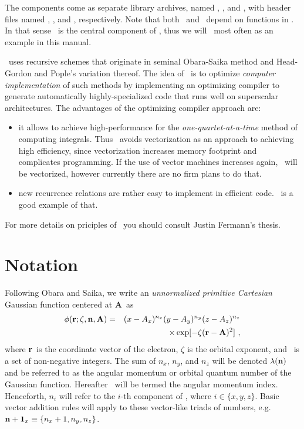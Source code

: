 \documentclass[12pt]{article}
\begin{document}
The components come as separate library archives, named \libinta , \libderiva , and \librija ,
with header files named \libinth , \libderivh , and \librijh , respectively.
Note that both \libderiv\ and \librij\ depend on functions in \libint. In that sense \libint\ is
the central component of \LIBINT, thus we will \libint\ most often as an example in this manual.

\LIBINT\ uses recursive schemes that originate in seminal Obara-Saika method\cite{Obara86} and Head-Gordon and Pople's
variation thereof.\cite{Head-Gordon88}
The idea of \LIBINT\ is to optimize {\em computer implementation} of such methods by implementing
an optimizing compiler to generate automatically highly-specialized code that runs well on
superscalar architectures. The advantages of the optimizing compiler approach are:
\begin{itemize}
\item it allows to achieve high-performance
for the {\em one-quartet-at-a-time} method of computing integrals.
Thus \LIBINT\ avoids vectorization as an approach to achieving high efficiency,
since vectorization increases memory footprint and complicates programming. If the use of vector
machines increases again, \LIBINT\ will be vectorized, however currently there are no firm plans
to do that.
\item new recurrence relations are rather easy to implement in efficient code.
\librij\ is a good example of that.
\end{itemize}

For more details on priciples of \LIBINT\ you should consult Justin Fermann's thesis.\cite{Fermann96:PhD}

\section{Notation}

Following Obara and Saika,\cite{Obara86}
we write an {\em unnormalized primitive Cartesian} Gaussian function centered at {\bf A}\ as
\begin{eqnarray}
\phi ({\bf r}; \zeta, {\bf n}, {\bf A}) & = & (x - A_x)^{n_x} (y - A_y)^{n_y} (z - A_z)^{n_z} \nonumber \\
& & \times \exp [-\zeta({\bf r}-{\bf A})^2]\ ,
\end{eqnarray}
where {\bf r}\ is the coordinate vector of the electron, $\zeta$ is the orbital exponent, and
\n\ is a set of non-negative integers. The sum of $n_x$, $n_y$, and $n_z$ will be denoted $\lambda({\bf n})$
and be referred to as the angular momentum or orbital quantum number of the Gaussian function.
Hereafter \n\ will be termed the angular momentum index.
Henceforth, $n_i$ will refer to the $i$-th component of \n, where $i \in \{x, y, z\}$.
Basic vector addition rules will apply to these vector-like triads of numbers, e.g.
${\bf n} + {\bf 1}_x \equiv \{ n_x+1, n_y, n_z\}$.
\end{document}
